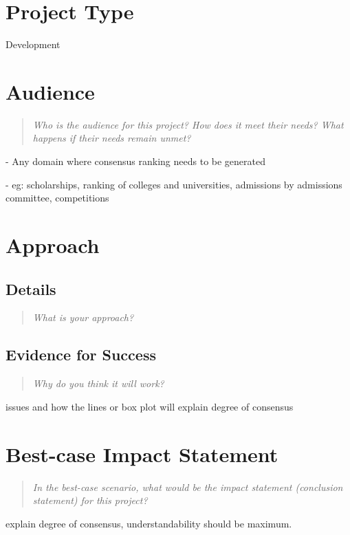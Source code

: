 \documentclass{proc}
\begin{document}
\section{Project Type}
Development

\section{Audience} 
\begin{quote}
\textit{Who is the audience for this project? 
How does it meet their needs? 
What happens if their needs remain unmet?}
\end{quote}

- Any domain where consensus ranking needs to be generated

- eg: scholarships, ranking of colleges and universities, admissions by admissions committee, competitions 

\section{Approach}
\subsection{Details}
\begin{quote}
\textit{What is your approach?}
\end{quote}



\subsection{Evidence for Success}
\begin{quote}
\textit{Why do you think it will work?} 
\end{quote}

issues and how the lines or box plot will explain degree of consensus

\section{Best-case Impact Statement}
\begin{quote}
\textit{In the best-case scenario, what would be the impact statement (conclusion statement) for this project? \cite{wijk2005value, pike2009science}}
\end{quote}

explain degree of consensus, understandability should be maximum.
\end{document}
